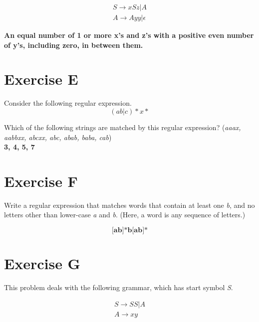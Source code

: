 \documentclass{article}
\begin{document}
\begin{align}
S \rightarrow xSz | A \\
A \rightarrow Ayy | \epsilon
\end{align}

\textbf{An equal number of 1 or more x's and z's with a positive even number of y's, including zero, in between them.}

\section*{Exercise E}
Consider the following regular expression.
\begin{equation}
(ab | c)*x*
\end{equation}

Which of the following strings are matched by this regular expression? (\emph{aaax, aabbxx, abcxx, abc, abab, baba, cab})\\
\vspace{1mm}
\textbf{3, 4, 5, 7}

\section*{Exercise F}
Write a regular expression that matches words that contain at least one \emph{b}, and no letters other than lower-case \emph{a} and \emph{b}. (Here, a word is any sequence of letters.)

\begin{equation}
\textbf{ [ab]*b[ab]* }
\end{equation}

\section*{Exercise G}
This problem deals with the following grammar, which has start symbol \emph{S}.

\begin{align}
S \rightarrow SS | A \\
A \rightarrow xy
\end{align}
\end{document}
